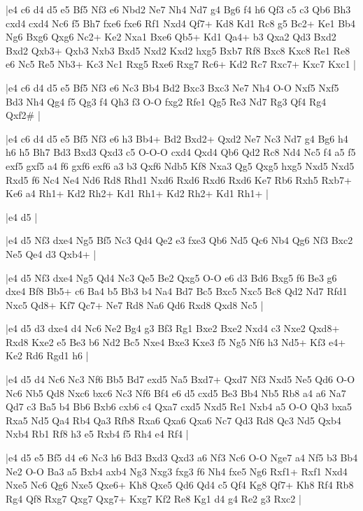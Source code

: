 \whitename{}
\blackname{}
\makegametitle
|e4 c6 d4 d5 e5 Bf5 Nf3 e6 Nbd2 Ne7 Nh4 Nd7 g4 Bg6 f4 h6 Qf3 c5 c3 Qb6 Bh3 cxd4 cxd4 Nc6 f5 Bh7 fxe6 fxe6 Rf1 Nxd4 Qf7+ Kd8 Kd1 Rc8 g5 Bc2+ Ke1 Bb4 Ng6 Bxg6 Qxg6 Nc2+ Ke2 Nxa1 Bxe6 Qb5+ Kd1 Qa4+ b3 Qxa2 Qd3 Bxd2 Bxd2 Qxb3+ Qxb3 Nxb3 Bxd5 Nxd2 Kxd2 hxg5 Bxb7 Rf8 Bxc8 Kxc8 Re1 Re8 e6 Nc5 Re5 Nb3+ Kc3 Nc1 Rxg5 Rxe6 Rxg7 Rc6+ Kd2 Rc7 Rxc7+ Kxc7 Kxc1  |

\whitename{}
\blackname{}
\makegametitle
|e4 c6 d4 d5 e5 Bf5 Nf3 e6 Nc3 Bb4 Bd2 Bxc3 Bxc3 Ne7 Nh4 O-O Nxf5 Nxf5 Bd3 Nh4 Qg4 f5 Qg3 f4 Qh3 f3 O-O fxg2 Rfe1 Qg5 Re3 Nd7 Rg3 Qf4 Rg4 Qxf2\#  |

\whitename{}
\blackname{}
\makegametitle
|e4 c6 d4 d5 e5 Bf5 Nf3 e6 h3 Bb4+ Bd2 Bxd2+ Qxd2 Ne7 Nc3 Nd7 g4 Bg6 h4 h6 h5 Bh7 Bd3 Bxd3 Qxd3 c5 O-O-O cxd4 Qxd4 Qb6 Qd2 Rc8 Nd4 Nc5 f4 a5 f5 exf5 gxf5 a4 f6 gxf6 exf6 a3 b3 Qxf6 Ndb5 Kf8 Nxa3 Qg5 Qxg5 hxg5 Nxd5 Nxd5 Rxd5 f6 Nc4 Ne4 Nd6 Rd8 Rhd1 Nxd6 Rxd6 Rxd6 Rxd6 Ke7 Rb6 Rxh5 Rxb7+ Ke6 a4 Rh1+ Kd2 Rh2+ Kd1 Rh1+ Kd2 Rh2+ Kd1 Rh1+  |

\whitename{}
\blackname{}
\makegametitle
|e4 d5  |

\whitename{}
\blackname{}
\makegametitle
|e4 d5 Nf3 dxe4 Ng5 Bf5 Nc3 Qd4 Qe2 e3 fxe3 Qb6 Nd5 Qc6 Nb4 Qg6 Nf3 Bxc2 Ne5 Qe4 d3 Qxb4+  |

\whitename{}
\blackname{}
\makegametitle
|e4 d5 Nf3 dxe4 Ng5 Qd4 Nc3 Qe5 Be2 Qxg5 O-O e6 d3 Bd6 Bxg5 f6 Be3 g6 dxe4 Bf8 Bb5+ c6 Ba4 b5 Bb3 b4 Na4 Bd7 Bc5 Bxc5 Nxc5 Bc8 Qd2 Nd7 Rfd1 Nxc5 Qd8+ Kf7 Qc7+ Ne7 Rd8 Na6 Qd6 Rxd8 Qxd8 Nc5  |

\whitename{}
\blackname{}
\makegametitle
|e4 d5 d3 dxe4 d4 Nc6 Ne2 Bg4 g3 Bf3 Rg1 Bxe2 Bxe2 Nxd4 c3 Nxe2 Qxd8+ Rxd8 Kxe2 e5 Be3 b6 Nd2 Bc5 Nxe4 Bxe3 Kxe3 f5 Ng5 Nf6 h3 Nd5+ Kf3 e4+ Ke2 Rd6 Rgd1 h6  |

\whitename{}
\blackname{}
\makegametitle
|e4 d5 d4 Nc6 Nc3 Nf6 Bb5 Bd7 exd5 Na5 Bxd7+ Qxd7 Nf3 Nxd5 Ne5 Qd6 O-O Nc6 Nb5 Qd8 Nxc6 bxc6 Nc3 Nf6 Bf4 e6 d5 cxd5 Be3 Bb4 Nb5 Rb8 a4 a6 Na7 Qd7 c3 Ba5 b4 Bb6 Bxb6 cxb6 c4 Qxa7 cxd5 Nxd5 Re1 Nxb4 a5 O-O Qb3 bxa5 Rxa5 Nd5 Qa4 Rb4 Qa3 Rfb8 Rxa6 Qxa6 Qxa6 Nc7 Qd3 Rd8 Qc3 Nd5 Qxb4 Nxb4 Rb1 Rf8 h3 e5 Rxb4 f5 Rh4 e4 Rf4  |

\whitename{}
\blackname{}
\makegametitle
|e4 d5 e5 Bf5 d4 e6 Nc3 h6 Bd3 Bxd3 Qxd3 a6 Nf3 Nc6 O-O Nge7 a4 Nf5 b3 Bb4 Ne2 O-O Ba3 a5 Bxb4 axb4 Ng3 Nxg3 fxg3 f6 Nh4 fxe5 Ng6 Rxf1+ Rxf1 Nxd4 Nxe5 Nc6 Qg6 Nxe5 Qxe6+ Kh8 Qxe5 Qd6 Qd4 c5 Qf4 Kg8 Qf7+ Kh8 Rf4 Rb8 Rg4 Qf8 Rxg7 Qxg7 Qxg7+ Kxg7 Kf2 Re8 Kg1 d4 g4 Re2 g3 Rxc2  |

